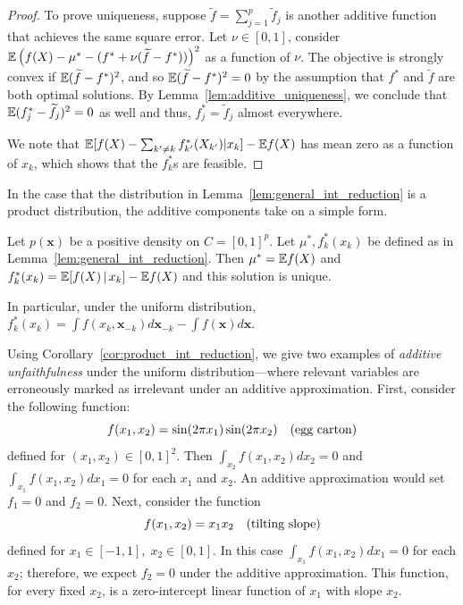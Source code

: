 \begin{proof}
To prove uniqueness, suppose $\tilde{f} = \sum_{j=1}^p \tilde{f}_j$ is another additive function that achieves the same square error. Let $\nu \in [0,1]$, consider ${\mathbb E}\left( f(X) - \mu^* - (f^* + \nu (\widetilde{f} - f^*)) \right)^2$ as a function of $\nu$. The objective is strongly convex if ${\mathbb E} (\widetilde{f} - f^*)^2$, and so ${\mathbb E}( \widetilde{f} - f^*)^2 = 0$ by the assumption that $f^*$ and $\tilde{f}$ are both optimal solutions. By Lemma~\ref{lem:additive_uniqueness}, we conclude that ${\mathbb E}( f^*_j - \widetilde{f}_j )^2 = 0$ as well and thus, $f^*_j = \tilde{f}_j$ almost everywhere.

We note that ${\mathbb E}[ f(X) -\sum_{k'\neq k} f^*_{k'}(X_{k'}) | x_k] - {\mathbb E}
f(X)$ has mean zero as a function of $x_k$, which shows that the $f^*_k$s
are feasible.
\end{proof} 

In the case that the distribution in
Lemma~\ref{lem:general_int_reduction} is a product distribution, 
the additive components take on a simple form.

\begin{corollary}
\label{cor:product_int_reduction}
Let $p(\mathbf{x})$ be a positive density on $C=[0,1]^p$.
Let $\mu^*, f^*_k(x_k)$ be defined as in Lemma~\ref{lem:general_int_reduction}.
Then $\mu^* = {\mathbb E} f(X)$ and $f^*_k(x_k) = {\mathbb E}[ f(X) {\,|\,} x_k] - {\mathbb E} f(X)$ and this solution is unique.
\end{corollary}

In particular, under the uniform distribution, $f^*_k(x_k) = \displaystyle\int f(x_k, \mathbf{x}_{-k}) d\mathbf{x}_{-k} - \int f(\mathbf{x}) d\mathbf{x}$.


\begin{example} Using Corollary~\ref{cor:product_int_reduction}, we
  give two examples of \emph{additive unfaithfulness} under the
  uniform distribution---where relevant variables are
  erroneously marked as irrelevant under an additive
  approximation. First, consider the following function:
\begin{equation}
f(x_1, x_2) = \sin( 2\pi x_1) \sin( 2 \pi x_2)\quad
\textrm{(egg carton)} 
\end{equation}
defined for $(x_1, x_2) \in [0,1]^2$.  Then
$\displaystyle\int_{x_2} f(x_1, x_2) d x_2 = 0$ and
$\displaystyle\int_{x_1} f(x_1, x_2) d x_1 = 0$ for each $x_1$ and $x_2$. An additive approximation
would set $f_1 = 0$ and $f_2 = 0$.  Next, consider the function
\begin{equation}
f(x_1, x_2) = x_1 x_2 \quad \textrm{(tilting slope)} 
\end{equation}
defined for $x_1 \in [-1,1],\; x_2 \in [0,1]$.  In this case
$\displaystyle\int_{x_1} f(x_1, x_2) d x_1 = 0$ for each $x_2$; therefore, we expect $f_2 = 0$ under the additive approximation. This function, for every fixed $x_2$, is a zero-intercept linear function of $x_1$ with slope $x_2$.
\end{example}

